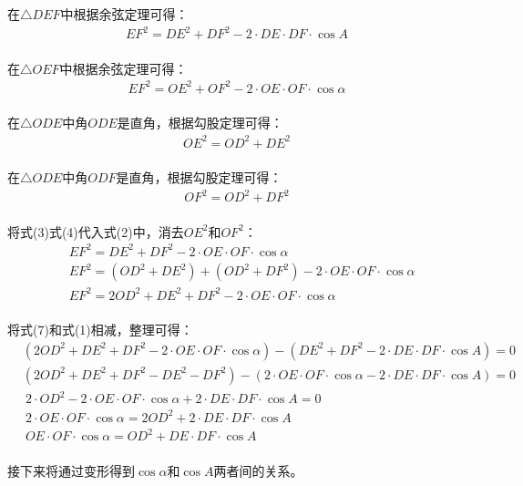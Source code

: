 \documentclass[UTF8]{ctexart}
\begin{document}
    在$\triangle DEF$中根据余弦定理可得：
    \begin{align}
        EF^2=DE^2+DF^2-2\cdot DE\cdot DF\cdot\cos{A}
    \end{align}\\
    在$\triangle OEF$中根据余弦定理可得：
    \begin{align}
        EF^2=OE^2+OF^2-2\cdot OE\cdot OF\cdot\cos{\alpha}
    \end{align}\\
    在$\triangle ODE$中角$ODE$是直角，根据勾股定理可得：
    \begin{align}
        OE^2=OD^2+DE^2
    \end{align}\\
    在$\triangle ODE$中角$ODF$是直角，根据勾股定理可得：
    \begin{align}
        OF^2=OD^2+DF^2
    \end{align}\\
    将式(3)式(4)代入式(2)中，消去$OE^2$和$OF^2$：
    \begin{align}
        &EF^2=DE^2+DF^2-2\cdot OE\cdot OF\cdot\cos{\alpha}\\[3mm]
        &EF^2=(OD^2+DE^2)+(OD^2+DF^2)-2\cdot OE\cdot OF\cdot\cos{\alpha}\\[3mm]
        &EF^2=2OD^2+DE^2+DF^2-2\cdot OE\cdot OF\cdot\cos{\alpha}
    \end{align}\\
    将式(7)和式(1)相减，整理可得：\vspace{3pt}
    \begin{align}
        &\left(2OD^2+DE^2+DF^2-2\cdot OE\cdot OF\cdot\cos{\alpha}\right)-\left(DE^2+DF^2-2\cdot DE\cdot DF\cdot\cos{A}\right)=0\\[3mm]
        &\left(2OD^2+DE^2+DF^2-DE^2-DF^2\right)-\left(2\cdot OE\cdot OF\cdot\cos{\alpha}-2\cdot DE\cdot DF\cdot\cos{A}\right)=0\\[3mm]
        &~2\cdot OD^2-2\cdot OE\cdot OF\cdot\cos{\alpha}+2\cdot DE\cdot DF\cdot\cos{A}=0\\[3mm]
        &~2\cdot OE\cdot OF\cdot\cos{\alpha}=2OD^2+2\cdot DE\cdot DF\cdot\cos{A}\\[3mm]
        &~OE\cdot OF\cdot\cos{\alpha}=OD^2+DE\cdot DF\cdot\cos{A}
    \end{align}\\
    接下来将通过变形得到$\cos{\alpha}$和$\cos{A}$两者间的关系。

\newpage
\end{document}
